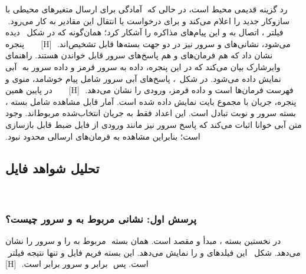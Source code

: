 ‫ رد گزینه قدیمی محیط است، در حالی که
‫ آمادگی برای ارسال متغیرهای محیطی
‫با سازوکار جدید را اعلام
‫می‌کند و  برای درخواست یا انتقال این مقادیر به کار
‫می‌رود.
‫
‫فیلتر ، اتصال به  و این پیام‌های مذاکره را آشکار کرد؛
‫همان‌گونه که در شکل~ دیده می‌شود، نشانی‌های  و سرور نیز در
‫دو جهت بسته‌ها قابل تشخیص‌اند.
‫
‫[H]
‫
‫
‫
‫
‫
‫پنجره  نشان داد که هم فرمان‌های  و هم پاسخ‌های سرور قابل خواندن
‫هستند. راهنمای وایرشارک بیان می‌کند که در این پنجره، داده  به سرور قرمز و داده سرور به
‫ آبی نمایش داده می‌شود. در شکل~، پاسخ‌های آبی
‫سرور شامل پیام خوشامد، منوی  و فهرست فرمان‌ها است و داده قرمز، ورودی  را نشان می‌دهد.
‫
‫[H]
‫
‫
‫
‫
‫
‫در پایین همین پنجره، جریان  با مجموع  بایت نمایش داده شده است. آمار قابل مشاهده
‫شامل  بسته ،  بسته سرور و  نوبت تبادل است. این اعداد فقط به جریان
‫انتخاب‌شده مربوط‌اند. وجود متن آبی خوانا اثبات می‌کند که پاسخ سرور نیز مانند ورودی  از فایل
‫ضبط قابل بازسازی است؛ بنابراین مشاهده به فرمان‌های ارسالی محدود نبود.
‫
‫\subsection{تحلیل شواهد فایل }
‫
‫\subsubsection{پرسش اول: نشانی  مربوط به  و سرور چیست؟}
‫
‫در نخستین بسته ، مبدأ  و مقصد  است. همان بسته
‫ مربوط به  را  و  سرور را  نشان می‌دهد.
‫شکل~ این فیلدهای  و  را نمایش می‌دهد.
‫این بسته فریم  فایل و تنها نتیجه فیلتر
‫ است. پس
‫ برابر  و سرور برابر  است.
‫
‫[H]
‫
